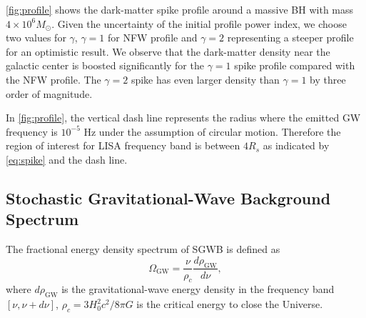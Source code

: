 \cref{fig:profile} shows the dark-matter spike profile around a massive \ac{BH} with mass $4\times 10^6 M_\odot$.
Given the uncertainty of the initial profile power index, we choose two values for $\gamma$, $\gamma=1$ for NFW profile and $\gamma=2$ representing a steeper profile for an optimistic result.
We observe that the dark-matter density near the galactic center is  boosted significantly for the $\gamma=1$ spike profile compared with the NFW profile. 
The $\gamma=2$ spike has even larger density than $\gamma=1$ by three order of magnitude.

In \cref{fig:profile}, the vertical dash line represents the radius where the emitted \ac{GW} frequency is $10^{-5}$ Hz under the assumption of circular motion.
Therefore the region of interest for LISA frequency band is between $4 R_s$ as indicated by \cref{eq:spike} and the dash line.

 \subsection{Stochastic Gravitational-Wave Background Spectrum}

The fractional energy density spectrum of \ac{SGWB} is defined as
\begin{equation}
\Omega_\textrm{GW} = \frac{\nu}{\rho_c}\frac{d\rho_\textrm{GW}}{d\nu},
\end{equation}
where $d\rho_\textrm{GW}$ is the gravitational-wave energy density in the frequency band $[\nu,\nu+d\nu]$, $\rho_c=3H_0^2c^2/8\pi G$ is the critical energy to close the Universe.

